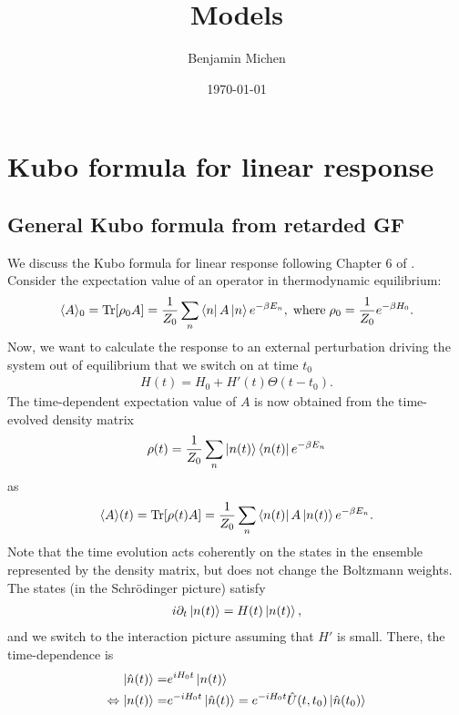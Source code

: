 \documentclass[english]{scrartcl}
\title{Models}
\author{Benjamin Michen}
\date{\today}
\newcommand{\mr}{\mathrm}
\begin{document}
\maketitle
{
\hypersetup{linkcolor=black}
\tableofcontents
}

\newpage

\section{Kubo formula for linear response}
\subsection{General Kubo formula from retarded GF}
We discuss the Kubo formula for linear response following Chapter 6 of \cite{MBQT}. Consider the expectation value of an operator in thermodynamic equilibrium:
\begin{align*}
\langle A \rangle_0 = \mr{Tr} [\rho_0 A] =  \frac{1}{Z_0} \sum_{n} \bra{n} A \ket{n}e^{- \beta E_n}, \; \text{where} \; \rho_0 = \frac{1}{Z_0}  e^{-\beta H_0}.
\end{align*}
Now, we want to calculate the response to an external perturbation driving the system out of equilibrium that we switch on at time $t_0$
\begin{align*}
H(t) = H_0 + H' (t)\Theta(t-t_0).
\end{align*}
The time-dependent expectation value of $A$ is now obtained from the time-evolved density matrix
\begin{align*}
\rho(t) = \frac{1}{Z_0}  \sum_n \ket{n(t)}\bra{n(t)} e^{-\beta E_n}
\end{align*}
as 
\begin{align}
\langle A \rangle (t) = \mr{Tr} [\rho(t) A] =  \frac{1}{Z_0} \sum_{n} \bra{n(t)} A \ket{n(t)}e^{- \beta E_n}. \label{Eqn:time_dep_A}
\end{align}
Note that the time evolution acts coherently on the states in the ensemble represented by the density matrix, but does not change the Boltzmann weights. The states (in the Schrödinger picture) satisfy 
\begin{align*}
i \partial_t \ket{n(t)} =  H(t) \ket{n(t)},
\end{align*}
and we switch to the interaction picture assuming that $H'$ is small. There, the time-dependence is
\begin{align*}
\ket{\hat n(t)} =& e^{i H_0 t} \ket{n(t)} \\
\Leftrightarrow \ket{n(t)}  = & e^{- i H_0 t} \ket{\hat n(t)} =e^{- i H_0 t} \hat U(t, t_0) \ket{\hat n(t_0)}
\end{align*}
\end{document}
